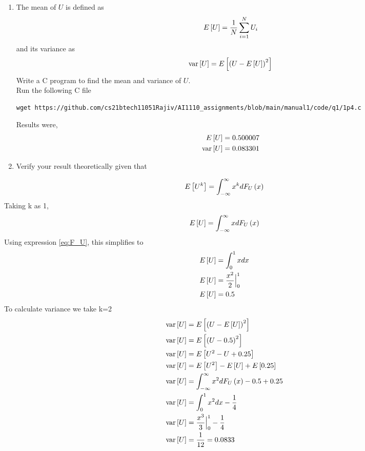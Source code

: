 \documentclass[journal,12pt,twocolumn]{IEEEtran}
\renewcommand\thesection{\arabic{section}}
\begin{document}
\begin{enumerate}[label=\thesection.\arabic*
,ref=\thesection.\theenumi]
\begin{figure}[ht!]
    \caption{The CDF of $U$}
    \label{fig:theory_uni_cdf}
\end{figure}
%
\item
The mean of $U$ is defined as
%
\begin{equation}
E\left[ U \right] = \frac{1}{N}\sum_{i=1}^{N}U_i
\end{equation}
%
and its variance as
%
\begin{equation}
    \text{var}\left[ U \right] = E\left[ \left(U- E\left[ U \right]\right)^2 \right] \end{equation}
Write a C program to  find the mean and variance of $U$. 
\\
\solution Run the following C file
\begin{lstlisting}
wget https://github.com/cs21btech11051Rajiv/AI1110_assignments/blob/main/manual1/code/q1/1p4.c
\end{lstlisting}
Results were,
\begin{align}
E\left[ U \right] = 0.500007 \\
\text{var}\left[ U \right] = 0.083301 
\end{align}
%
\item Verify your result theoretically given that
\end{enumerate}
%
\begin{align}
    E\left[ U^k \right] = \int_{-\infty}^{\infty}x^kdF_{U}\left(x\right)
    \label{eq:expectation}
\end{align}
\solution Taking k as 1,
\begin{align}
    E\left[ U \right] = \int_{-\infty}^{\infty}xdF_{U}\left(x\right)
\end{align}
Using expression \eqref{eq:F_U}, this simplifies to
\begin{align}
    E\left[ U \right] &= \int_{0}^{1}xdx \\
    E\left[ U \right] &= \frac{x^2}{2} \Big|_0^1 \\
    E\left[ U \right] &= 0.5
\end{align}
To calculate variance we take k=2
\begin{align}
    \text{var}\left[ U \right] &= E\left[ \left(U- E\left[ U \right]\right)^2 \right] \\
    \text{var}\left[ U \right] &= E\left[ \left(U-0.5\right)^2 \right] \\
    \text{var}\left[ U \right] &= E\left[ U^2 - U + 0.25 \right]  \\
    \text{var}\left[ U \right] &= E\left[ U^2 \right] - E\left[ U \right] + E\left[ 0.25 \right]  \\
    \text{var}\left[ U \right] &= \int_{-\infty}^{\infty}x^2dF_{U}\left(x\right) - 0.5 + 0.25  \\
    \text{var}\left[ U \right] &= \int_{0}^{1}x^2dx - \frac{1}{4}  \\   
     \text{var}\left[ U \right] &= \frac{x^3}{3} \Big|_0^1 - \frac{1}{4}  \\    
     \text{var}\left[ U \right] &= \frac{1}{12} = 0.0833 \\    
\end{align}
%
\end{document}
